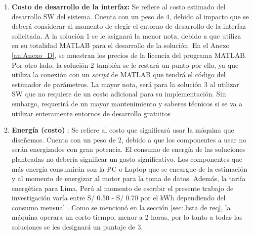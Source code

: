 \begin{enumerate}
    \item \textbf{Costo de desarrollo de la interfaz:} Se refiere al costo estimado del desarrollo \ac{SW} del sistema. Cuenta con un peso de 4, debido al impacto que se deberá considerar al momento de elegir el entorno de desarrollo de la interfaz solicitada. A la solución 1 se le asignará la menor nota, debido a que utiliza en su totalidad MATLAB para el desarrollo de la solución. En el Anexo \ref{an:Anexo_D}, se muestran los precios de la licencia del programa MATLAB. Por otro lado, la solución 2 también se le restará un punto por ello, ya que utiliza la conexión con un \textit{script} de MATLAB que tendrá el código del estimador de parámetros. La mayor nota, será para la solución 3 al utilizar \ac{SW} que no requiere de un costo adicional para su implementación. Sin embargo, requerirá de un mayor mantenimiento y saberes técnicos si se va a utilizar enteramente entornos de desarrollo gratuitos
    
    \item \textbf{Energía (costo)} : Se refiere al costo que significará usar la máquina que diseñemos. Cuenta con un peso de 2, debido a que los componentes a usar no serán energizados con gran potencia. El consumo de energía de las soluciones planteadas no debería significar un gasto significativo. Los componentes que más energía consumirán son la PC o Laptop que se encargue de la estimación y al momento de energizar al motor para la toma de datos. Además, la tarifa energética para Lima, Perú al momento de escribir el presente trabajo de investigación varía entre S/ 0.50 - S/ 0.70 por el kWh dependiendo del consumo mensual \autocite{Enel_energía}. Como se mencionó en la sección \ref{sec:.lista de req}, la máquina operara un corto tiempo, menor a 2 horas, por lo tanto a todas las soluciones se les designará un puntaje de 3.

\end{enumerate}